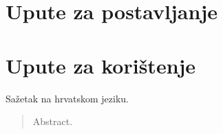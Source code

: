 \documentclass[times, utf8, zavrsni]{fer}
\begin{document}
\begin{appendices}

\chapter{Upute za postavljanje}

\chapter{Upute za korištenje}

\end{appendices}




\begin{sazetak}
Sažetak na hrvatskom jeziku.

\end{sazetak}

\begin{abstract}
Abstract.

\end{abstract}
\end{document}
